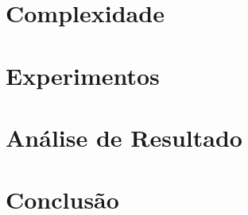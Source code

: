 \documentclass[
	12pt,
	a4paper,
	onepage,
	brazil
]{article}
\begin{document}
	\section{Complexidade}
	
	\section{Experimentos}
	
	\section{Análise de Resultado}
	
	\section{Conclusão}
	
	\nocite{*}
	
	\printbibliography[title=Referências]
\end{document}
